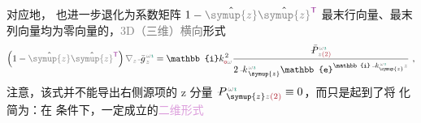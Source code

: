 对应地， 也进一步退化为系数矩阵 $1 - \hat{\mathcolor{gray}{\symup{z}}} \hat{\mathcolor{gray}{\symup{z}}}^{\mathsf{\textcolor{Plum}{T}}}$ 最末行向量、最末列向量均为零向量的，\textcolor{gray}{3D（三维）}\textcolor{gray}{横向}形式
\begin{align}  \label{eq:simplify6-V2'-SVA-V_1singular-nokxky-zeta}
	\left( 1 - \hat{\mathcolor{gray}{\symup{z}}} \hat{\mathcolor{gray}{\symup{z}}}^{\mathsf{\textcolor{Plum}{T}}} \right) \mathcolor{gray}{\nabla_z} \xint{{}^{}_{\mathcolor{gray}{-}}}{10}{\bar{g}}^{\;\!\mathcolor{gray}{\omega} \textcolor{PineGreen}{\imath}}_{\;\! \mathcolor{gray}{z}} = \mathbb{i} k_{\textcolor{Maroon}{\mathsf{o}} \mathcolor{gray}{\omega}}^{\;\! 2} \frac{\xint{\mathcolor{gray}{-}}{25}{\bar{P}}^{\;\! \mathcolor{gray}{\omega} \textcolor{PineGreen}{\imath}}_{\;\! \mathcolor{gray}{z} \textcolor{Maroon}{(2)}}}{2 \xint{\begin{smallmatrix} ~ \\ {}^{}_{\mathcolor{gray}{-}} \\ ~ \end{smallmatrix}}{15}{k}_{\;\! \symup{z}}^{\;\! \mathcolor{gray}{\omega} \textcolor{PineGreen}{\imath}} \mathbb{e}^{\mathbb{i} \xint{\begin{smallmatrix} ~ \\ {}^{}_{\mathcolor{gray}{-}} \\ ~ \end{smallmatrix}}{15}{k}_{\symup{z}}^{\;\! \mathcolor{gray}{\omega} \textcolor{PineGreen}{\imath}} \mathcolor{gray}{z}}} ~,
\end{align}
注意，该式并不能导出右侧源项的 z 分量 $\xint{\mathcolor{gray}{-}}{24}{P}^{\;\! \mathcolor{gray}{\omega} \textcolor{PineGreen}{\imath}}_{\;\! \symup{z} \mathcolor{gray}{z} \textcolor{Maroon}{(2)}} \equiv 0$，而只是起到了将  化简为：在  条件下，一定成立的\textcolor{Plum}{二维形式}
